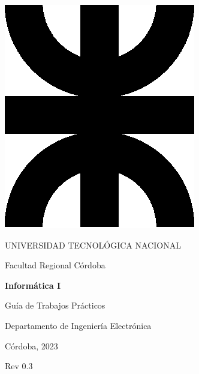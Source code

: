 \thispagestyle{empty}

\begin{center}

\includegraphics[scale=.3]{img/utn.eps}

\medskip
UNIVERSIDAD TECNOLÓGICA NACIONAL

Facultad Regional Córdoba

\vspace{3cm}

\textbf{
  \huge
  Informática I
}

\vspace{2cm}

\LARGE{Guía de Trabajos Prácticos}

\vfill

Departamento de Ingeniería Electrónica

\vspace{1cm}

Córdoba, 2023

\vspace{1cm}

Rev 0.3

\end{center}

